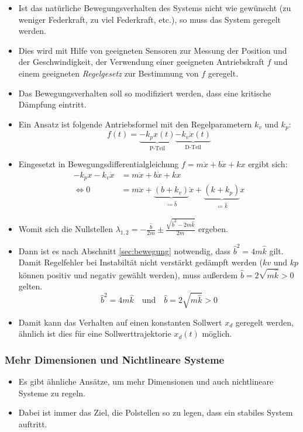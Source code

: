 				\begin{itemize}
					\item Ist das natürliche Bewegungsverhalten des Systems nicht wie gewünscht (zu weniger Federkraft, zu viel Federkraft, etc.), so muss das System geregelt werden.
					\item Dies wird mit Hilfe von geeigneten Sensoren zur Messung der Position und der Geschwindigkeit, der Verwendung einer geeigneten Antriebskraft \(f\) und einem geeigneten \textit{Regelgesetz} zur Bestimmung von \(f\) geregelt.
					\item Das Bewegungsverhalten soll so modifiziert werden, dass eine kritische Dämpfung eintritt.
					\item Ein Ansatz ist folgende Antriebsformel mit den Regelparametern \( k _ v \) und \( k _ p \):
						\begin{equation*}
							f(t) = \underbrace{-k_px(t)}_{\text{P-Teil}} \underbrace{-k_v\dot{x}(t)}_{\text{D-Teil}}
						\end{equation*}
					\item Eingesetzt in Bewegungsdifferentialgleichung \( f = m\ddot{x} + b\dot{x} + kx \) ergibt sich:
						\begin{align*}
							     -k_px -k_v\dot{x} &= m\ddot{x} + b\dot{x} + kx \\
							\iff 0 &= m\ddot{x} + \underbrace{(b + k_v)}_{ \coloneqq \hat{b} }\dot{x} + \underbrace{(k + k_p)}_{ \coloneqq \hat{k} }x
						\end{align*}
					\item Womit sich die Nullstellen \( \lambda _ { 1, 2 } = -\frac{\hat{b}}{2m} \pm \frac{\sqrt{\hat{b}^2 - 2m\hat{k}}}{2m} \) ergeben.
					\item Dann ist es nach Abschnitt \ref{sec:bewegung} notwendig, dass \( \hat{b}^2 = 4m\hat{k} \) gilt. Damit Regelfehler bei Instabiltät nicht verstärkt gedämpft werden (\( kv \) und \( kp \) können positiv und negativ gewählt werden), muss außerdem \( \hat{b} = 2\sqrt{m\hat{k}} > 0 \) gelten.
						\begin{equation*}
							\hat{b}^2 = 4m\hat{k} \quad\text{und}\quad \hat{b} = 2\sqrt{m\hat{k}} > 0
						\end{equation*}
					\item Damit kann das Verhalten auf einen konstanten Sollwert \( x _ d \) geregelt werden, ähnlich ist dies für eine Sollwerttrajektorie \( x _ d (t) \) möglich.
				\end{itemize}
			
			\subsubsection{Mehr Dimensionen und Nichtlineare Systeme}
				\begin{itemize}
					\item Es gibt ähnliche Ansätze, um mehr Dimensionen und auch nichtlineare Systeme zu regeln.
					\item Dabei ist immer das Ziel, die Polstellen so zu legen, dass ein stabiles System auftritt.
				\end{itemize}

